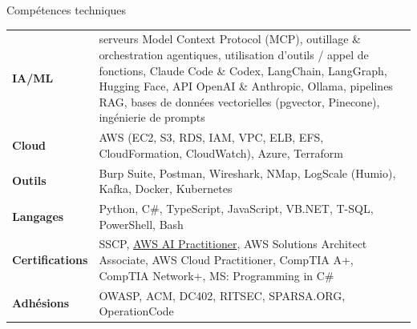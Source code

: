 \documentclass{resume} %
\begin{document}
\begin{rSection}{Comp\'etences techniques}

\begin{tabular}{ @{} >{\bfseries}l @{\hspace{6ex}} p{4.5in} }
IA/ML & serveurs Model Context Protocol (MCP), outillage \& orchestration agentiques, utilisation d'outils / appel de fonctions, Claude Code \& Codex, LangChain, LangGraph, Hugging Face, API OpenAI \& Anthropic, Ollama, pipelines RAG, bases de donn\'ees vectorielles (pgvector, Pinecone), ing\'enierie de prompts\\
Cloud & AWS (EC2, S3, RDS, IAM, VPC, ELB, EFS, CloudFormation, CloudWatch), Azure, Terraform\\
Outils & Burp Suite, Postman, Wireshark, NMap, LogScale (Humio), Kafka, Docker, Kubernetes\\
Langages & Python, C\#, TypeScript, JavaScript, VB.NET, T-SQL, PowerShell, Bash\\
Certifications & SSCP, \href{https://www.credly.com/badges/6eda0d26-3542-4f75-b1e5-6d481e701bf1}{AWS AI Practitioner}, AWS Solutions Architect Associate, AWS Cloud Practitioner, CompTIA A+, CompTIA Network+, MS: Programming in C\#\\
Adh\'esions & OWASP, ACM, DC402, RITSEC, SPARSA.ORG, OperationCode
\end{tabular}

\end{rSection}


\end{document}

